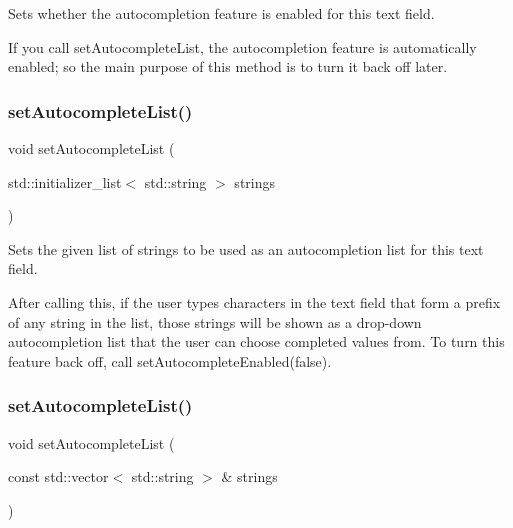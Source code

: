 Sets whether the autocompletion feature is enabled for this text field. 

If you call set\+Autocomplete\+List, the autocompletion feature is automatically enabled; so the main purpose of this method is to turn it back off later. \mbox{\label{classsgl_1_1GTextField_ab0245df51aa762af89f0d2cf31ce6ddd}} 
\subsubsection{\texorpdfstring{set\+Autocomplete\+List()}{setAutocompleteList()}\hspace{0.1cm}{\footnotesize\ttfamily [1/2]}}
{\footnotesize\ttfamily void set\+Autocomplete\+List (\begin{DoxyParamCaption}\item[{std\+::initializer\+\_\+list$<$ std\+::string $>$}]{strings }\end{DoxyParamCaption})\hspace{0.3cm}{\ttfamily [virtual]}}



Sets the given list of strings to be used as an autocompletion list for this text field. 

After calling this, if the user types characters in the text field that form a prefix of any string in the list, those strings will be shown as a drop-\/down autocompletion list that the user can choose completed values from. To turn this feature back off, call set\+Autocomplete\+Enabled(false). \mbox{\label{classsgl_1_1GTextField_aee449aad44655f02ed75727b3f6dd4d6}} 
\subsubsection{\texorpdfstring{set\+Autocomplete\+List()}{setAutocompleteList()}\hspace{0.1cm}{\footnotesize\ttfamily [2/2]}}
{\footnotesize\ttfamily void set\+Autocomplete\+List (\begin{DoxyParamCaption}\item[{const std\+::vector$<$ std\+::string $>$ \&}]{strings }\end{DoxyParamCaption})\hspace{0.3cm}{\ttfamily [virtual]}}



